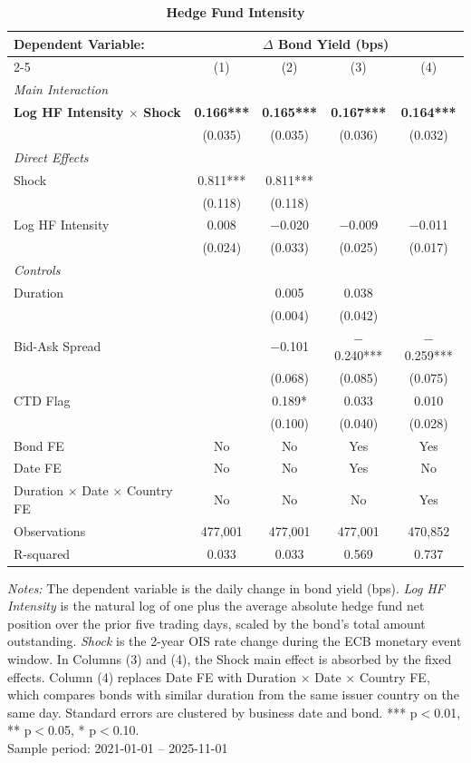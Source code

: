 \documentclass[english, 11pt, oneside]{article}
\begin{document}
\begin{table}[t]
\centering
\caption{\textbf{Hedge Fund Intensity}}
\footnotesize
\setlength{\tabcolsep}{10pt}
\renewcommand{\arraystretch}{1.1}
\begin{tabular}{l c c c c}
\toprule
\textbf{Dependent Variable:} & \multicolumn{4}{c}{\textbf{$\Delta$ Bond Yield (bps)}} \\
\cmidrule(lr){2-5}
 & (1) & (2) & (3) & (4) \\
\midrule
\textit{Main Interaction} & & & & \\
\textbf{Log HF Intensity $\times$ Shock} & \textbf{0.166***} & \textbf{0.165***} & \textbf{0.167***} & \textbf{0.164***} \\
 & (0.035) & (0.035) & (0.036) & (0.032) \\
\addlinespace
\textit{Direct Effects} & & & & \\
Shock & 0.811*** & 0.811*** &  &  \\
 & (0.118) & (0.118) &  &  \\
Log HF Intensity & 0.008 & $-$0.020 & $-$0.009 & $-$0.011 \\
 & (0.024) & (0.033) & (0.025) & (0.017) \\
\addlinespace
\textit{Controls} & & & & \\
Duration & & 0.005 & 0.038 &  \\
 & & (0.004) & (0.042) &  \\
Bid-Ask Spread & & $-$0.101 & $-$0.240*** & $-$0.259*** \\
 & & (0.068) & (0.085) & (0.075) \\
CTD Flag & & 0.189* & 0.033 & 0.010 \\
 & & (0.100) & (0.040) & (0.028) \\
\midrule
Bond FE & No & No & Yes & Yes \\
Date FE & No & No & Yes & No \\
Duration $\times$ Date $\times$ Country FE & No & No & No & Yes \\
\midrule
Observations & 477,001 & 477,001 & 477,001 & 470,852 \\
R-squared & 0.033 & 0.033 & 0.569 & 0.737 \\
\bottomrule
\end{tabular}
\label{tab:intensity}

\vspace{1ex}
\raggedright\scriptsize
\textit{Notes:} The dependent variable is the daily change in bond yield (bps). \textit{Log HF Intensity} is the natural log of one plus the average absolute hedge fund net position over the prior five trading days, scaled by the bond's total amount outstanding. \textit{Shock} is the 2-year OIS rate change during the ECB monetary event window. In Columns (3) and (4), the Shock main effect is absorbed by the fixed effects. Column (4) replaces Date FE with Duration $\times$ Date $\times$ Country FE, which compares bonds with similar duration from the same issuer country on the same day. Standard errors are clustered by business date and bond. *** p$<$0.01, ** p$<$0.05, * p$<$0.10. \\ Sample period: 2021-01-01 -- 2025-11-01
\end{table}
\end{document}

